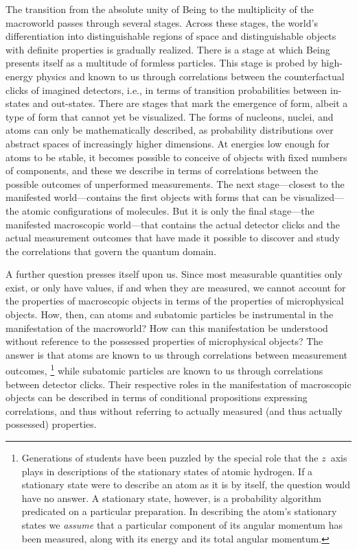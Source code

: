 The transition from the absolute unity of Being to the multiplicity of the macroworld passes through several stages. Across these stages, the world's differentiation into distinguishable regions of space and distinguishable objects with definite properties is gradually realized. There is a stage at which Being presents itself as a multitude of formless particles. This stage is probed by high-energy physics and known to us through correlations between the counterfactual clicks of imagined detectors, i.e., in terms of transition probabilities between in-states and out-states. There are stages that mark the emergence of form, albeit a type of form that cannot yet be visualized. The forms of nucleons, nuclei, and atoms can only be mathematically described, as probability distributions over abstract spaces of increasingly higher dimensions. At energies low enough for atoms to be stable, it becomes possible to conceive of objects with fixed numbers of components, and these we describe in terms of correlations between the possible outcomes of unperformed measurements. The next stage---closest to the manifested world---contains the first objects with forms that can be visualized---the atomic configurations of molecules. But it is only the final stage---the manifested macroscopic world---that contains the actual detector clicks and the actual measurement outcomes that have made it possible to discover and study the correlations that govern the quantum domain.

A further question presses itself upon us. Since most measurable quantities only exist, or only have values, if and when they are measured, we cannot account for the properties of macroscopic objects in terms of the properties of microphysical objects. How, then, can atoms and subatomic particles be instrumental in the manifestation of the macroworld? How can this manifestation be understood without reference to the possessed properties of microphysical objects? The answer is that atoms are known to us through correlations between measurement outcomes,%
\footnote{Generations of students have been puzzled by the special role that the $z$~axis plays in descriptions of the stationary states of atomic hydrogen. If a stationary state were to describe an atom as it is by itself, the question would have no answer. A stationary state, however, is a probability algorithm predicated on a particular preparation. In describing the atom's stationary states we \emph{assume} that a particular component of its angular momentum has been measured, along with its energy and its total angular momentum.}
while subatomic particles are known to us through correlations between detector clicks. Their respective roles in the manifestation of macroscopic objects can be described in terms of conditional propositions expressing correlations, and thus without referring to actually measured (and thus actually possessed) properties.


